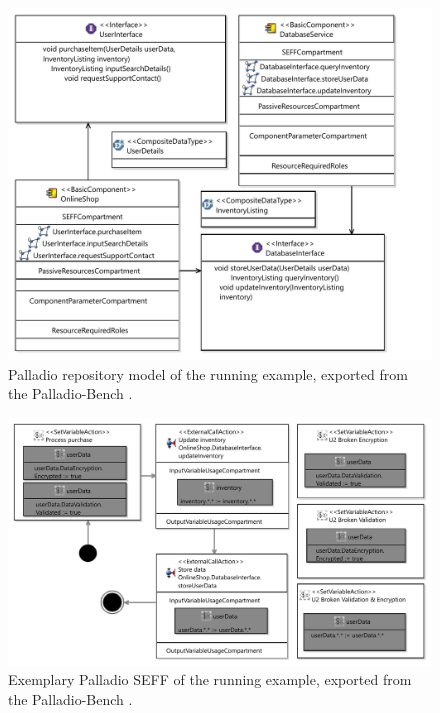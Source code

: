 \begin{figure}
    \centering
    \includegraphics[width=\textwidth]{figures/chapter12/runningexample_repository.pdf}
    \caption[Palladio repository model of the running example.]{Palladio repository model of the running example, exported from the Palladio-Bench \cite{reussner_palladio_2024}.}
    \label{fig:appendix:runningexample:repository}
\end{figure}

\begin{figure}
    \centering
    \includegraphics[width=\textwidth]{figures/chapter12/runningexample_seff.pdf}
    \caption[Exemplary Palladio \acf*{SEFF} of the running example.]{Exemplary Palladio \acf*{SEFF} of the running example, exported from the Palladio-Bench \cite{reussner_palladio_2024}.}
    \label{fig:appendix:runningexample:seff}
\end{figure}


